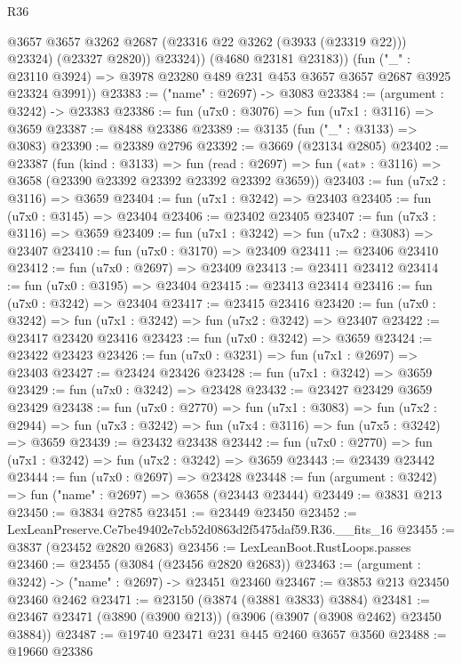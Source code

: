 \begin{lexlean}{R36}
\begin{coremodule}
                @3657
                @3657
                @3262
                @2687
                (@23316 @22 @3262 (@3933 (@23319 @22)))
                @23324)
              (@23327 @2820))
            @23324))
        (@4680 @23181 @23183))
      (fun ("_" : @23110 @3924) =>
      @3978 @23280 @489 @231 @453 @3657 @3657 @2687 @3925 @23324 @3991))
@23383 := ("name" : @2697) -> @3083
@23384 := (argument : @3242) -> @23383
@23386 := fun (u7x0 : @3076) => fun (u7x1 : @3116) => @3659
@23387 := @8488 @23386
@23389 := @3135 (fun ("_" : @3133) => @3083)
@23390 := @23389 @2796
@23392 := @3669 (@23134 @2805)
@23402 := @23387
    (fun (kind : @3133) =>
    fun (read : @2697) => fun («at» : @3116) => @3658 (@23390 @23392 @23392 @23392 @23392 @3659))
@23403 := fun (u7x2 : @3116) => @3659
@23404 := fun (u7x1 : @3242) => @23403
@23405 := fun (u7x0 : @3145) => @23404
@23406 := @23402 @23405
@23407 := fun (u7x3 : @3116) => @3659
@23409 := fun (u7x1 : @3242) => fun (u7x2 : @3083) => @23407
@23410 := fun (u7x0 : @3170) => @23409
@23411 := @23406 @23410
@23412 := fun (u7x0 : @2697) => @23409
@23413 := @23411 @23412
@23414 := fun (u7x0 : @3195) => @23404
@23415 := @23413 @23414
@23416 := fun (u7x0 : @3242) => @23404
@23417 := @23415 @23416
@23420 := fun (u7x0 : @3242) => fun (u7x1 : @3242) => fun (u7x2 : @3242) => @23407
@23422 := @23417 @23420 @23416
@23423 := fun (u7x0 : @3242) => @3659
@23424 := @23422 @23423
@23426 := fun (u7x0 : @3231) => fun (u7x1 : @2697) => @23403
@23427 := @23424 @23426
@23428 := fun (u7x1 : @3242) => @3659
@23429 := fun (u7x0 : @3242) => @23428
@23432 := @23427 @23429 @3659 @23429
@23438 := fun (u7x0 : @2770) =>
  fun (u7x1 : @3083) =>
  fun (u7x2 : @2944) => fun (u7x3 : @3242) => fun (u7x4 : @3116) => fun (u7x5 : @3242) => @3659
@23439 := @23432 @23438
@23442 := fun (u7x0 : @2770) => fun (u7x1 : @3242) => fun (u7x2 : @3242) => @3659
@23443 := @23439 @23442
@23444 := fun (u7x0 : @2697) => @23428
@23448 := fun (argument : @3242) => fun ("name" : @2697) => @3658 (@23443 @23444)
@23449 := @3831 @213
@23450 := @3834 @2785
@23451 := @23449 @23450
@23452 := LexLeanPreserve.Ce7be49402e7cb52d0863d2f5475daf59.R36.__fits_16
@23455 := @3837 (@23452 @2820 @2683)
@23456 := LexLeanBoot.RustLoops.passes
@23460 := @23455 (@3084 (@23456 @2820 @2683))
@23463 := (argument : @3242) -> ("name" : @2697) -> @23451 @23460
@23467 := @3853 @213 @23450 @23460 @2462
@23471 := @23150 (@3874 (@3881 @3833) @3884)
@23481 := @23467 @23471 (@3890 (@3900 @213)) (@3906 (@3907 (@3908 @2462) @23450 @3884))
@23487 := @19740 @23471 @231 @445 @2460 @3657 @3560
@23488 := @19660 @23386

\end{coremodule}
\end{lexlean}
